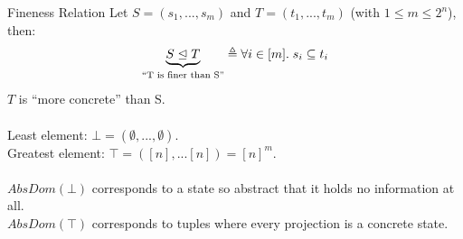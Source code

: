 \documentclass[11pt,svgnames,smaller,aspectratio=43,english]{beamer}
\makeatletter
\newcommand{\bunder}[2]{\underbrace{#1}_{\text{\scriptsize\tabular[t]{@{}c@{}}#2\endtabular}}}
\makeatother
\begin{document}
\begin{frame}{Fineness Relation} %
	Let $S = (s_1, ..., s_m)$ and $T = (t_1, ..., t_m)$ (with $1 \leq m \leq 2^n$), then:
	\begin{equation*}
		\bunder{S \trianglelefteq T}{``T is finer than S''} \triangleq \forall i \in [m].\; s_i \subseteq t_i
	\end{equation*}
	$T$ is ``more concrete'' than S.\\\;\\
	\pause
	Least element: $\bot = (\emptyset, ..., \emptyset)$.\\
	Greatest element: $\top = ([n], ... [n]) = [n]^m$.\\\;\\

	\pause
	$\mathit{AbsDom}(\bot)$ corresponds to a state so abstract that it holds no information at all.\\ %
	$\mathit{AbsDom}(\top)$ corresponds to tuples where every projection is a concrete state.
\end{frame}
\end{document}
